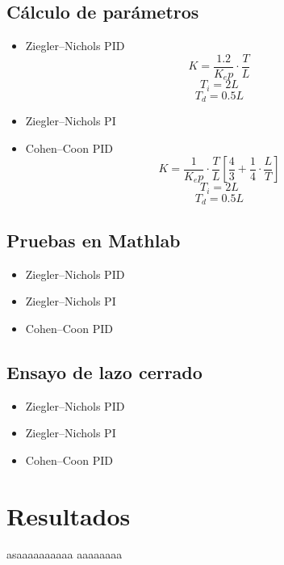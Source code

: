 \documentclass[11pt]{article}
\begin{document}
\subsection{Cálculo de parámetros}
    \begin{itemize} 
        \item Ziegler–Nichols PID \\
            $$K = \frac{1.2}{K_ep} \cdot \frac{T}{L}$$
            $$T_i = 2L$$
            $$T_d = 0.5L$$
            
            
        \item Ziegler–Nichols PI \\
            
        \item Cohen–Coon PID
            $$K = \frac{1}{K_ep} \cdot \frac{T}{L} \left[\frac{4}{3} +\frac{1}{4} \cdot \frac{L}{T}\right]$$
            $$T_i = 2L$$
            $$T_d = 0.5L$$ 
    \end{itemize}

\subsection{Pruebas en Mathlab}
    \begin{itemize} 
        \item Ziegler–Nichols PID \\
        
        \item Ziegler–Nichols PI \\
        
        \item Cohen–Coon PID
    \end{itemize}
    
\subsection{Ensayo de lazo cerrado}
    \begin{itemize} 
        \item Ziegler–Nichols PID \\
        
        \item Ziegler–Nichols PI \\
        
        \item Cohen–Coon PID
    \end{itemize}


\section{Resultados}
asaaaaaaaaaa
aaaaaaaa
\end{document}
